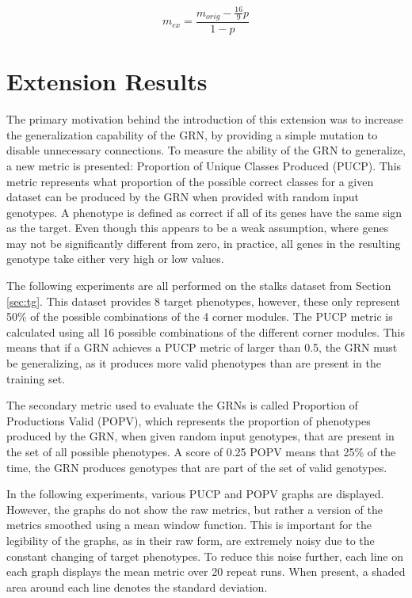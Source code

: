 \documentclass[twocolumn,a4paper,11pt]{article}
\begin{document}
    \begin{equation}
        m_{ex} = \frac{m_{orig} - \frac{16}{9}p}{1-p}
        \label{eq:rate-of-sign}
    \end{equation}

    \section{Extension Results}

    The primary motivation behind the introduction of this extension was to increase the generalization capability of the GRN, by providing a simple mutation to disable unnecessary connections. To measure the ability of the GRN to generalize, a new metric is presented: Proportion of Unique Classes Produced (PUCP). This metric represents what proportion of the possible correct classes for a given dataset can be produced by the GRN when provided with random input genotypes. A phenotype is defined as correct if all of its genes have the same sign as the target. Even though this appears to be a weak assumption, where genes may not be significantly different from zero, in practice, all genes in the resulting genotype take either very high or low values.

    The following experiments are all performed on the stalks dataset from Section \ref{sec:tg}. This dataset provides 8 target phenotypes, however, these only represent 50\% of the possible combinations of the 4 corner modules. The PUCP metric is calculated using all 16 possible combinations of the different corner modules. This means that if a GRN achieves a PUCP metric of larger than 0.5, the GRN must be generalizing, as it produces more valid phenotypes than are present in the training set.

    The secondary metric used to evaluate the GRNs is called Proportion of Productions Valid (POPV), which represents the proportion of phenotypes produced by the GRN, when given random input genotypes, that are present in the set of all possible phenotypes. A score of 0.25 POPV means that 25\% of the time, the GRN produces genotypes that are part of the set of valid genotypes.

    In the following experiments, various PUCP and POPV graphs are displayed. However, the graphs do not show the raw metrics, but rather a version of the metrics smoothed using a mean window function. This is important for the legibility of the graphs, as in their raw form, are extremely noisy due to the constant changing of target phenotypes. To reduce this noise further, each line on each graph displays the mean metric over 20 repeat runs. When present, a shaded area around each line denotes the standard deviation.
\end{document}
